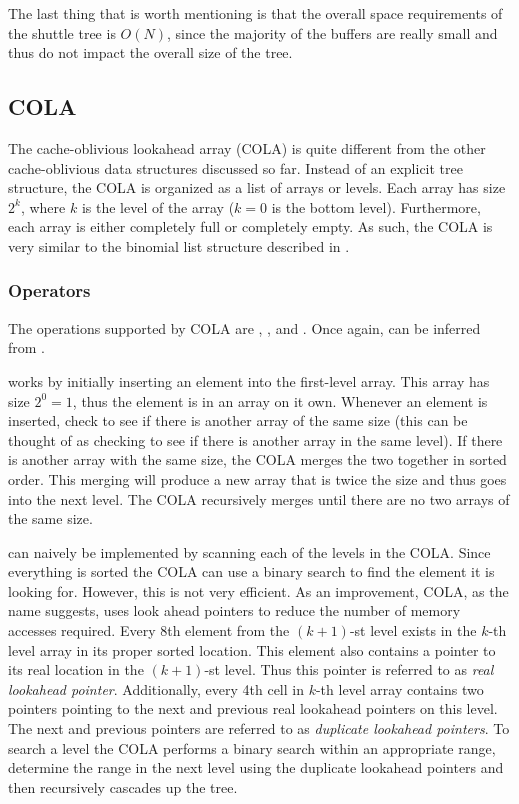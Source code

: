 \documentclass[preprint]{style}
\begin{document}
The last thing that is worth mentioning is that the overall space requirements
of the shuttle tree is $O(N)$, since the majority of the buffers are really
small and thus do not impact the overall size of the tree.

\subsection{COLA}

The cache-oblivious lookahead array (COLA) is quite different from the other
cache-oblivious data structures discussed so far. Instead of an explicit tree
structure, the COLA is organized as a list of arrays or levels. Each array has
size $2^k$, where $k$ is the level of the array ($k = 0$ is the bottom level).
Furthermore, each array is either completely full or completely empty. As such,
the COLA is very similar to the binomial list structure described in
\cite{BentleySaxe}.

\subsubsection{Operators}

The operations supported by COLA are \Search{}, \Insert{}, and \Scan{}. Once
again, \Delete{} can be inferred from \Insert{}.

\Insert{} works by initially inserting an element into the first-level array.
This array has size $2^0 = 1$, thus the element is in an array on it own.
Whenever an element is inserted, check to see if there is another array of
the same size (this can be thought of as checking to see if there is another
array in the same level). If there is another array with the same size, the
COLA merges the two together in sorted order. This merging will produce a new
array that is twice the size and thus goes into the next level. The COLA
recursively merges until there are no two arrays of the same size.

\Search{} can naively be implemented by scanning each of the levels in the
COLA. Since everything is sorted the COLA can use a binary search to find the
element it is looking for. However, this is not very efficient. As an
improvement, COLA, as the name suggests, uses look ahead pointers to reduce the
number of memory accesses required. Every 8th element from the $(k+1)$-st level
exists in the $k$-th level array in its proper sorted location. This element
also contains a pointer to its real location in the $(k+1)$-st level. Thus this
pointer is referred to as \textit{real lookahead pointer}. Additionally, every
4th cell in $k$-th level array contains two pointers pointing to the next and
previous real lookahead pointers on this level. The next and previous pointers
are referred to as \textit{duplicate lookahead pointers}. To search a level the
COLA performs a binary search within an appropriate range, determine the range
in the next level using the duplicate lookahead pointers and then recursively
cascades up the tree.
\end{document}
